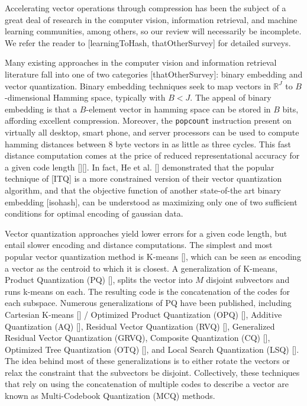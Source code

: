 
Accelerating vector operations through compression has been the subject of a great deal of research in the computer vision, information retrieval, and machine learning communities, among others, so our review will necessarily be incomplete. We refer the reader to [learningToHash, thatOtherSurvey] for detailed surveys. %

Many existing approaches in the computer vision and information retrieval literature fall into one of two categories [thatOtherSurvey]: binary embedding and vector quantization. Binary embedding techniques seek to map vectors in $\mathbb{R}^J$ to $B$-dimensional Hamming space, typically with $B < J$. The appeal of binary embedding is that a $B$-element vector in hamming space can be stored in $B$ bits, affording excellent compression. Moreover, the \texttt{popcount} instruction present on virtually all desktop, smart phone, and server processors can be used to compute hamming distances between 8 byte vectors in as little as three cycles. This fast distance computation comes at the price of reduced representational accuracy for a given code length [][]. In fact, He et al. [] demonstrated that the popular technique of [ITQ] is a more constrained version of their vector quantization algorithm, and that the objective function of another state-of-the art binary embedding [isohash], can be understood as maximizing only one of two sufficient conditions for optimal encoding of gaussian data.

Vector quantization approaches yield lower errors for a given code length, but entail slower encoding and distance computations. The simplest and most popular vector quantization method is K-means [], which can be seen as encoding a vector as the centroid to which it is closest. A generalization of K-means, Product Quantization (PQ) [], splits the vector into $M$ disjoint subvectors and runs k-means on each. The resulting code is the concatenation of the codes for each subspace. Numerous generalizations of PQ have been published, including Cartesian K-means [] / Optimized Product Quantization (OPQ) [], Additive Quantization (AQ) [], Residual Vector Quantization (RVQ) [], Generalized Residual Vector Quantization (GRVQ), Composite Quantization (CQ) [], Optimized Tree Quantization (OTQ) [], and Local Search Quantization (LSQ) []. The idea behind most of these generalizations is to either rotate the vectors or relax the constraint that the subvectors be disjoint. Collectively, these techniques that rely on using the concatenation of multiple codes to describe a vector are known as Multi-Codebook Quantization (MCQ) methods.

